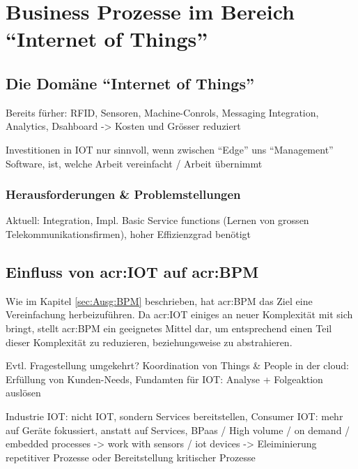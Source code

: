 
\chapter{Business Prozesse im Bereich "`Internet of Things"'}

\section{Die Domäne "`Internet of Things"'}

Bereits fürher: RFID, Sensoren, Machine-Conrols, Messaging Integration, Analytics, Dsahboard -> Kosten und Grösser reduziert

Investitionen in IOT nur sinnvoll, wenn zwischen "`Edge"' uns "`Management"' Software, ist, welche Arbeit vereinfacht / Arbeit übernimmt

\newpage
\subsection{Herausforderungen \& Problemstellungen}

Aktuell: Integration, Impl. Basic Service functions (Lernen von grossen Telekommunikationsfirmen), hoher Effizienzgrad benötigt

\newpage
\section{Einfluss von \gls{acr:IOT} auf \gls{acr:BPM}}

Wie im Kapitel \ref{sec:Ausg:BPM} beschrieben, hat \gls{acr:BPM} das Ziel eine Vereinfachung herbeizuführen. Da \gls{acr:IOT} einiges an neuer Komplexität mit sich bringt, stellt \gls{acr:BPM} ein geeignetes Mittel dar, um entsprechend einen Teil dieser Komplexität zu reduzieren, beziehungsweise zu abstrahieren.



Evtl. Fragestellung umgekehrt? 
Koordination von Things \& People in der cloud: Erfüllung von Kunden-Needs, Fundamten für IOT: Analyse + Folgeaktion auslösen

	Industrie IOT: nicht IOT, sondern Services bereitstellen, Consumer IOT: mehr auf Geräte fokussiert, anstatt auf Services, BPaas / High volume / on demand / embedded processes -> work with sensors / iot devices -> Eleiminierung repetitiver Prozesse oder Bereitstellung kritischer Prozesse

